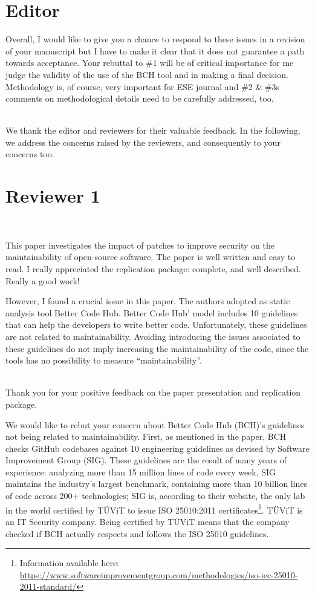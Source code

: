 \documentclass[11pt,fleqn]{article}
\title{\vspace*{-2cm}{\bf Authors' Response to the Review of
 EMSE-D-20-00300:\\
 ``Fixing Vulnerabilities Potentially Hinders Maintainability''}}
\author{Sofia Reis, Rui Abreu, Luis Cruz}
\date{}
\newcommand{\eline}{\vspace*{.75\baselineskip}}
\newcommand{\Referee}[1]{\eline \noindent {\bf Reviewer comment #1:} \\}
\newcommand{\Us}{\eline \noindent {\bf Response:}\\}
\newcommand{\newreviewer}[1]{\section*{Reviewer #1}\vspace*{-1.05\baselineskip}}
\newcommand{\editor}[1]{\section*{Editor #1}\vspace*{-1.05\baselineskip}}
\newenvironment{revcomment}[1][]
{\Referee{#1}\begin{rcomment}}
{\end{rcomment}}
\newenvironment{reveditor}
{\begin{rcomment}}
{\end{rcomment}}
\begin{document}
\maketitle

\editor{}

\begin{reveditor}
    Overall, I would like to give you a chance to respond to 
    these issues in a revision of your manuscript but I have 
    to make it clear that it does not guarantee a path towards 
    acceptance. Your rebuttal to \#1 will be of critical importance 
    for me judge the validity of the use of the BCH tool and in 
    making a final decision. Methodology is, of course, very 
    important for ESE journal and \#2 \& \#3s comments on methodological 
    details need to be carefully addressed, too. 
\end{reveditor}

\Us We thank the editor and reviewers for their valuable feedback. In the 
following, we address the concerns raised by the reviewers, and consequently 
to your concerns too.

\newreviewer{1}

\begin{revcomment}[1.1]

    This paper investigates the impact of patches to improve 
    security on the maintainability of open-source software. 
    The paper is well written and easy to read. I really 
    appreciated the replication package: complete, and well 
    described. Really a good work!
    
    However, I found a crucial issue in this paper. The authors 
    adopted as static analysis tool Better Code Hub. Better Code 
    Hub' model includes 10 guidelines that can help the developers to 
    write better code. Unfortunately, these guidelines are not related 
    to maintainability. Avoiding introducing the issues associated to 
    these guidelines do not imply increasing the maintainability of the 
    code, since the tools has no possibility to measure ``maintainability''.

\end{revcomment}

\Us Thank you for your positive feedback on the paper presentation and replication
package. 

We would like to rebut your concern about Better Code Hub (BCH)'s guidelines not 
being related to maintainability. First, as mentioned in the paper, BCH checks GitHub 
codebases against 10 engineering guidelines as devised by Software Improvement Group 
(SIG). These guidelines are the result of many years of experience: analyzing more 
than 15 million lines of code every week, SIG maintains the industry’s largest 
benchmark, containing more than 10 billion lines of code across 200+ technologies; SIG 
is, according to their website, the only lab in the world certified by TÜViT to issue ISO 25010:2011 
certificates\footnote{Information available here: 
\url{https://www.softwareimprovementgroup.com/methodologies/iso-iec-25010-2011-standard/}}.
TÜViT is an IT Security company. Being certified by TÜViT means 
that the company checked if BCH actually respects and follows the ISO 25010 guidelines.   
\end{document}
